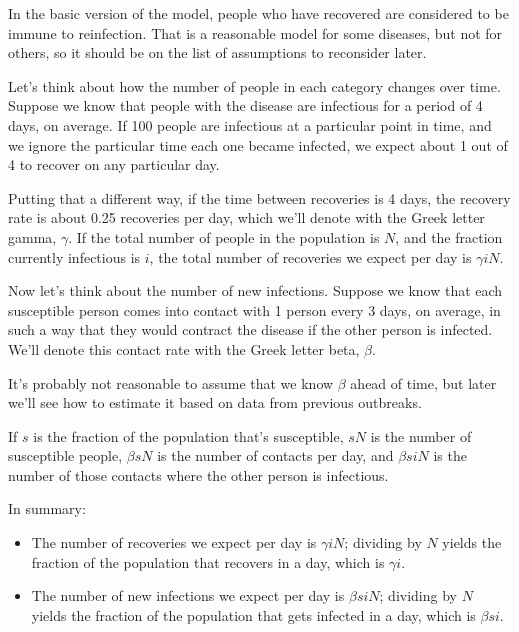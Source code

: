 \documentclass[12pt]{book}
\theoremstyle{exercise}
\begin{document}
In the basic version of the model, people who have recovered are considered to be immune to reinfection.  That is a reasonable model for some diseases, but not for others, so it should be on the list of assumptions to reconsider later.

Let's think about how the number of people in each category changes over time.  Suppose we know that people with the disease are infectious for a period of 4 days, on average.  If 100 people are infectious at a particular point in time, and we ignore the particular time each one became infected, we expect about 1 out of 4 to recover on any particular day.

Putting that a different way, if the time between recoveries is 4 days, the recovery rate is about 0.25 recoveries per day, which we'll denote with the Greek letter gamma, $\gamma$.  If the total number of people in the population is $N$, and the fraction currently infectious is $i$, the total number of recoveries we expect per day is $\gamma i N$.

Now let's think about the number of new infections.  Suppose we know that each susceptible person comes into contact with 1 person every 3 days, on average, in such a way that they would contract the disease if the other person is infected.  We'll denote this contact rate with the Greek letter beta, $\beta$.

It's probably not reasonable to assume that we know $\beta$ ahead of time, but later we'll see how to estimate it based on data from previous outbreaks.

If $s$ is the fraction of the population that's susceptible, $s N$ is the number of susceptible people, $\beta s N$ is the number of contacts per day, and $\beta s i N$ is the number of those contacts where the other person is infectious.

In summary:

\begin{itemize}

\item The number of recoveries we expect per day is $\gamma i N$; dividing by $N$ yields the fraction of the population that recovers in a day, which is $\gamma i$.

\item The number of new infections we expect per day is $\beta s i N$; dividing by $N$ yields the fraction of the population that gets infected in a day, which is $\beta s i$.

\end{itemize}
\end{document}
